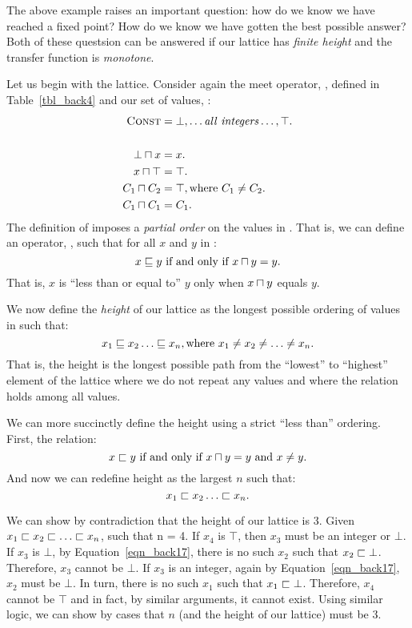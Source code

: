 \documentclass[12pt]{report}
\begin{document}
The above example raises an important question: how do we know we have
reached a fixed point? How do we know we have gotten the best possible
answer?  Both of these questsion can be answered if our lattice has
\emph{finite height} and the transfer function is \emph{monotone}.

Let us begin with the lattice. Consider again the meet operator, \lub,
defined in Table~\ref{tbl_back4} and our set of values, \setLC:
\begin{align*}
  \setLC &= \bot, \dots \mathit{all\ integers} \dots, \top. \\\\
  \bot \lub x &= x. \\
  x \lub \top &= \top.\\
  C_1 \lub C_2 &= \top, \text{where}\ C_1 \neq C_2.\\
  C_1 \lub C_1 &= C_1.
\end{align*}
The definition of \lub imposes a \emph{partial order} on the values
in \setLC. That is, we can define an operator, \sqlte, such that
for all $x$ and $y$ in \setLC:
\begin{equation}
  x \sqlte y\ \text{if and only if}\ x \lub y = y.
  \label{eqn_back9}
\end{equation}
That is, $x$ is ``less than or equal to'' $y$ only when $x \lub y$ equals
$y$.

We now define the \emph{height} of our lattice as the
longest possible ordering of values in \setLC such that:
\begin{equation}
  x_1 \sqlte x_2 \dots \sqlte x_n, \text{where}\ x_1 \neq x_2 \neq \dots \neq x_n.
  \label{eqn_back10}
\end{equation}
That is, the height is the longest possible path from the ``lowest''
to ``highest'' element of the lattice where we do not repeat any
values and where the \sqlte relation holds among all values.

We can more succinctly define the height using a strict ``less than''
ordering. First, the \sqlt relation:
\begin{equation}
  x \sqlt y\ \text{if and only if}\ x \lub y = y\ \text{and}\ x \neq y.
\end{equation}
And now we can redefine height as the largest $n$ such that:
\begin{equation}
  x_1 \sqlt x_2 \dots \sqlt x_n.
  \label{eqn_back17}
\end{equation}

We can show by contradiction that the height of our lattice is
3. Given $x_1 \sqlt x_2 \sqlt \dots \sqlt x_n$, such that n = 4. If
$x_4$ is $\top$, then $x_3$ must be an integer or $\bot$. If $x_3$ is
$\bot$, by Equation~\eqref{eqn_back17}, there is no such $x_2$ such
that $x_2 \sqsubset \bot$. Therefore, $x_3$ cannot be $\bot$. If $x_3$ is
an integer, again by Equation~\eqref{eqn_back17}, $x_2$ must be
$\bot$. In turn, there is no such $x_1$ such that $x_1 \sqsubset
\bot$. Therefore, $x_4$ cannot be $\top$ and in fact, by similar
arguments, it cannot exist. Using similar logic, we can show by cases
that $n$ (and the height of our lattice) must be 3.
\end{document}
